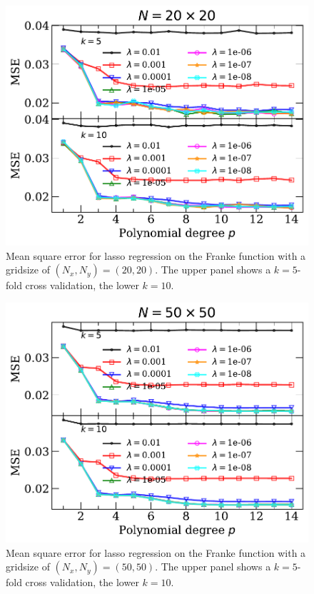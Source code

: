 \documentclass[a4paper, 
amsfonts, 
amssymb, 
amsmath, 
reprint, 
showkeys, 
nofootinbib, 
twoside]{revtex4-2}
\begin{document}
\begin{figure}
    \centering
    \includegraphics[width = \columnwidth]{Figures/mseLasso_n20.pdf}
    \caption{Mean square error for lasso regression on the Franke function with a gridsize of $(N_x,N_y) = (20, 20)$. The upper panel shows a $k = 5$-fold cross validation, the lower $k = 10$.}
    \label{fig:mse_lasso_20}
\end{figure}

\begin{figure}
    \centering
    \includegraphics[width = \columnwidth]{Figures/mseLasso_n50.pdf}
    \caption{Mean square error for lasso regression on the Franke function with a gridsize of $(N_x,N_y) = (50, 50)$. The upper panel shows a $k = 5$-fold cross validation, the lower $k = 10$.}
    \label{fig:mse_lasso_50}
\end{figure}
\end{document}
